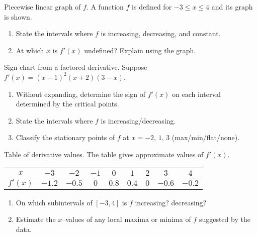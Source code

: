 \documentclass[11pt]{article}
\def\textbf#1{#1}%
\newcounter{question}
\begin{document}
\begin{question}
\textbf{Piecewise linear graph of $f$.}
A function $f$ is defined for $-3\le x\le 4$ and its graph is shown.
\begin{enumerate}
  \item State the intervals where $f$ is increasing, decreasing, and constant.
  \item At which $x$ is $f'(x)$ undefined? Explain using the graph.
\end{enumerate}

\begin{center}
\end{center}
\end{question}

\begin{question}
\textbf{Sign chart from a factored derivative.}
Suppose $f'(x)=(x-1)^{2}(x+2)(3-x)$.
\begin{enumerate}
  \item Without expanding, determine the sign of $f'(x)$ on each interval determined by the critical points.
  \item State the intervals where $f$ is increasing/decreasing.
  \item Classify the stationary points of $f$ at $x=-2,\,1,\,3$ (max/min/flat/none).
\end{enumerate}
\end{question}

\begin{question}
\textbf{Table of derivative values.}
The table gives approximate values of $f'(x)$.

\begin{center}
\begin{tabular}{c|cccccccc}
$x$ & $-3$ & $-2$ & $-1$ & $0$ & $1$ & $2$ & $3$ & $4$\\\hline
$f'(x)$ & $-1.2$ & $-0.5$ & $0$ & $0.8$ & $0.4$ & $0$ & $-0.6$ & $-0.2$
\end{tabular}
\end{center}

\begin{enumerate}
  \item On which subintervals of $[-3,4]$ is $f$ increasing? decreasing?
  \item Estimate the $x$–values of any local maxima or minima of $f$ suggested by the data.
\end{enumerate}
\end{question}
\end{document}
